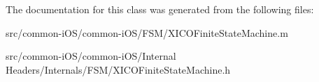 The documentation for this class was generated from the following files\+:\begin{DoxyCompactItemize}
\item 
src/common-\/i\+O\+S/common-\/i\+O\+S/\+F\+S\+M/X\+I\+C\+O\+Finite\+State\+Machine.\+m\item 
src/common-\/i\+O\+S/common-\/i\+O\+S/\+Internal Headers/\+Internals/\+F\+S\+M/X\+I\+C\+O\+Finite\+State\+Machine.\+h\end{DoxyCompactItemize}
